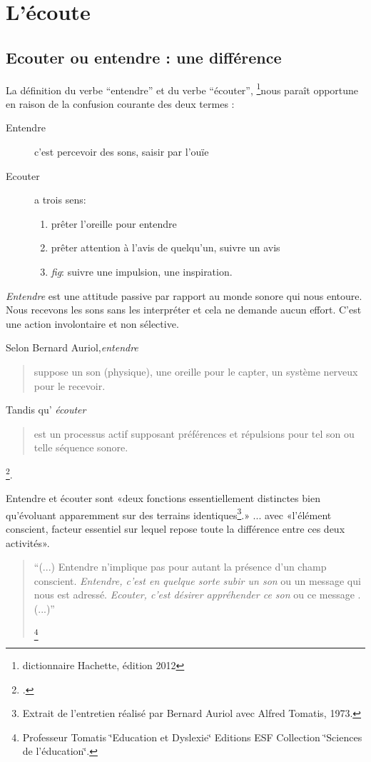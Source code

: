 \chapter{L'écoute}

\section{Ecouter ou entendre : une différence}

La définition du verbe ``entendre'' et du verbe ``écouter'', 
\footnote{dictionnaire Hachette, édition 2012 }nous paraît opportune %
en raison de la confusion courante des deux termes :
\begin{description}
\item[Entendre] c'est  percevoir des sons, saisir par l'ouïe
\item[Ecouter] a trois sens: 
\begin{enumerate}
	\item prêter l'oreille pour entendre
	\item prêter attention
	à l'avis de quelqu'un, suivre un avis
	\item \emph{fig}: suivre une impulsion,
	une inspiration.
\end{enumerate}
\end{description}



\emph{Entendre} est une attitude passive par rapport au monde sonore
qui nous entoure. Nous recevons les sons sans les interpréter et cela
ne demande aucun effort. C'est une action involontaire et non
sélective.

    Selon Bernard Auriol,\textit{entendre} \begin{quote}
	suppose un son (physique), une oreille
	pour le capter, un système nerveux pour le recevoir.
\end{quote} Tandis qu' \textit{écouter }\begin{quote}
	est un
	processus actif supposant préférences et répulsions pour tel son ou
	telle séquence sonore.
\end{quote}\footnote{\cite{Auri96:clesons}.}.

Entendre et écouter sont «deux
fonctions essentiellement distinctes bien qu'évoluant apparemment sur
des terrains identiques\footnote{Extrait de l'entretien réalisé par
	Bernard Auriol avec Alfred Tomatis, 1973.}.» ... avec «l'élément conscient, facteur essentiel sur lequel repose toute la
différence entre ces deux activités».
\begin{quote}
	``(...) Entendre n'implique pas pour autant la présence d'un champ
	conscient.\emph{ Entendre, c\textquoteright est en quelque sorte subir
		un son }ou un message qui nous est adressé. \emph{Ecouter, c'est désirer
		appréhender ce son }ou ce message . (...)'' 
	
	\footnote{Professeur Tomatis \char`\"{}Education et Dyslexie\char`\"{} Editions
		ESF Collection \char`\"{}Sciences de l'éducation\char`\"{}.}
\end{quote}


